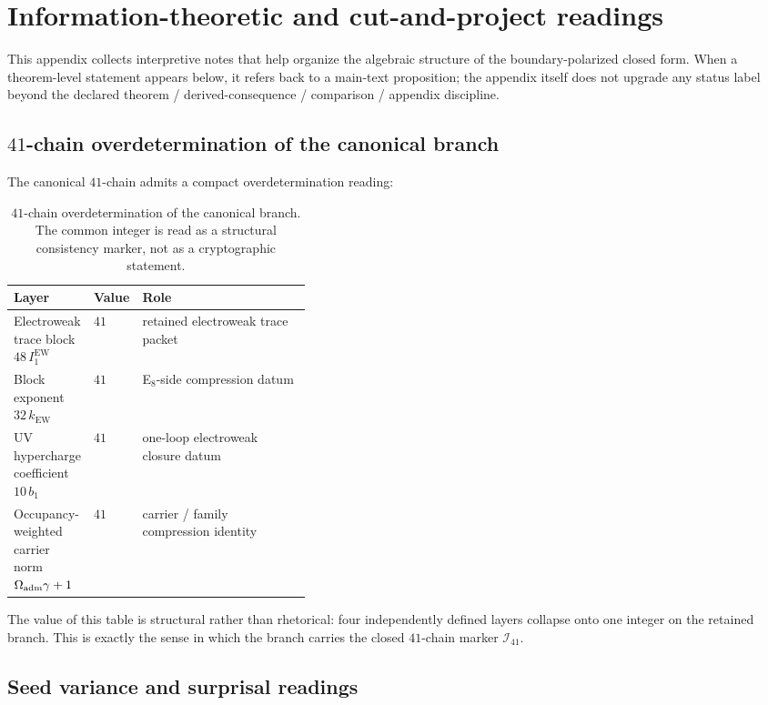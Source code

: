 \section{Information-theoretic and cut-and-project readings}
\label{app:info-readings}

This appendix collects interpretive notes that help organize the algebraic structure of the
boundary-polarized closed form. When a theorem-level statement appears below, it refers back to a
main-text proposition; the appendix itself does not upgrade any status label beyond the declared
theorem / derived-consequence / comparison / appendix discipline.

\subsection{\texorpdfstring{$41$}{41}-chain overdetermination of the canonical branch}

The canonical $41$-chain admits a compact overdetermination reading:

\begin{table}[H]
\centering
\small
\begin{tabularx}{\linewidth}{@{}>{\raggedright\arraybackslash}p{0.26\linewidth}>{\raggedleft\arraybackslash}p{0.12\linewidth}Y@{}}
\toprule
Layer & Value & Role \\
\midrule
Electroweak trace block $48\,I_1^{\mathrm{EW}}$ & $41$ & retained electroweak trace packet \\
Block exponent $32\,k_{\mathrm{EW}}$ & $41$ & E$_8$-side compression datum \\
UV hypercharge coefficient $10\,b_1$ & $41$ & one-loop electroweak closure datum \\
Occupancy-weighted carrier norm $\Omega_{\mathrm{adm}}\gamma+1$ & $41$ & carrier / family compression identity \\
\bottomrule
\end{tabularx}
\caption{$41$-chain overdetermination of the canonical branch. The common integer is read as a
structural consistency marker, not as a cryptographic statement.}
\label{tab:checksum-41}
\end{table}

The value of this table is structural rather than rhetorical: four independently defined layers
collapse onto one integer on the retained branch. This is exactly the sense in which the branch
carries the closed $41$-chain marker $\mathcal I_{41}$.

\subsection{Seed variance and surprisal readings}

